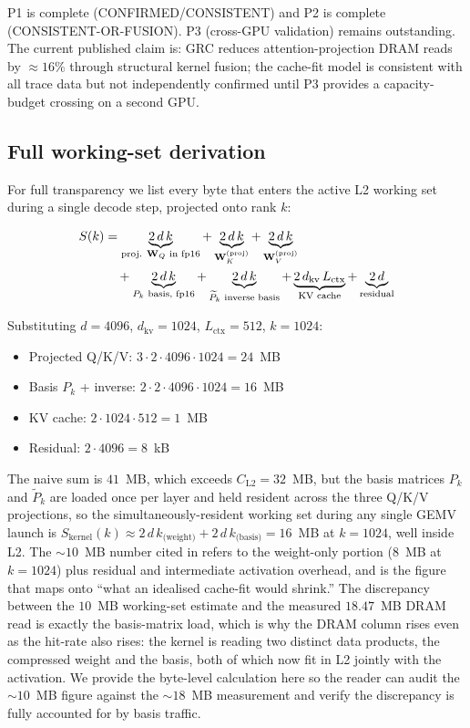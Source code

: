 \documentclass[11pt]{article}
\begin{document}
P1 is complete (CONFIRMED/CONSISTENT) and P2 is complete (CONSISTENT-OR-FUSION).
P3 (cross-GPU validation) remains outstanding.
The current published claim is: GRC reduces attention-projection DRAM reads
by $\approx16\%$ through structural kernel fusion; the cache-fit model is
consistent with all trace data but not independently confirmed until
P3 provides a capacity-budget crossing on a second GPU.

\subsection{Full working-set derivation}
\label{sec:workingset-math}

For full transparency we list every byte that enters the active L2
working set during a single decode step, projected onto rank $k$:

\begin{align}
S(k) &= \underbrace{2\,d\,k}_{\text{proj. }\mathbf{W}_Q\text{ in fp16}}
       + \underbrace{2\,d\,k}_{\mathbf{W}_K^{(\text{proj})}}
       + \underbrace{2\,d\,k}_{\mathbf{W}_V^{(\text{proj})}}\notag\\
     &\quad + \underbrace{2\,d\,k}_{P_k\text{ basis, fp16}}
       + \underbrace{2\,d\,k}_{\widetilde P_k\text{ inverse basis}}
       + \underbrace{2\,d_\text{kv}\,L_\text{ctx}}_{\text{KV cache}}
       + \underbrace{2\,d}_{\text{residual}} \label{eq:Sk}
\end{align}

Substituting $d{=}4096$, $d_\text{kv}{=}1024$, $L_\text{ctx}{=}512$,
$k{=}1024$:
\begin{itemize}
\item Projected Q/K/V: $3\cdot 2\cdot 4096\cdot 1024 = 24$~MB
\item Basis $P_k$ + inverse: $2\cdot 2\cdot 4096\cdot 1024 = 16$~MB
\item KV cache: $2\cdot 1024\cdot 512 = 1$~MB
\item Residual: $2\cdot 4096 = 8$~kB
\end{itemize}

The naive sum is $41$~MB, which exceeds $C_\text{L2}{=}32$~MB, but the
basis matrices $P_k$ and $\widetilde P_k$ are loaded once per layer and
held resident across the three Q/K/V projections, so the
simultaneously-resident working set during any single GEMV
launch is $S_\text{kernel}(k) \approx 2\,d\,k_\text{(weight)} +
2\,d\,k_\text{(basis)} = 16$~MB at $k{=}1024$, well inside L2. The
${\sim}10$~MB number cited in  refers to the
weight-only portion ($8$~MB at $k{=}1024$) plus residual and
intermediate activation overhead, and is the figure that maps onto
``what an idealised cache-fit would shrink.'' The discrepancy between
the $10$~MB working-set estimate and the measured $18.47$~MB DRAM read
is exactly the basis-matrix load, which is why the DRAM column rises
even as the hit-rate also rises: the kernel is reading two distinct
data products, the compressed weight and the basis, both of which now
fit in L2 jointly with the activation. We provide the byte-level
calculation here so the reader can audit the ${\sim}10$~MB figure
against the ${\sim}18$~MB measurement and verify the discrepancy is
fully accounted for by basis traffic.
\end{document}
